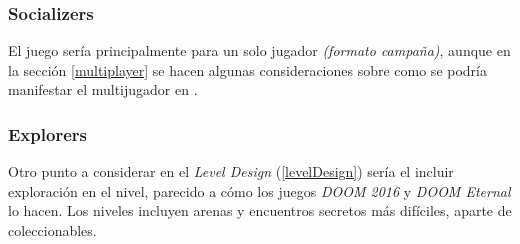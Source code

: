         \subsubsection{Socializers}
            El juego sería principalmente para un solo jugador \textit{(formato campaña)}, aunque en la sección \ref{multiplayer} se hacen algunas consideraciones sobre como se podría manifestar el multijugador en \TWD.
        \subsubsection{Explorers}
            Otro punto a considerar en el \textit{Level Design} (\ref{levelDesign}) sería el incluir exploración en el nivel, parecido a cómo los juegos \textit{DOOM 2016}\cite{doom2016} y \textit{DOOM Eternal}\cite{doomEternal2020} lo hacen. Los niveles incluyen arenas y encuentros secretos más difíciles, aparte de coleccionables.

\newpage


